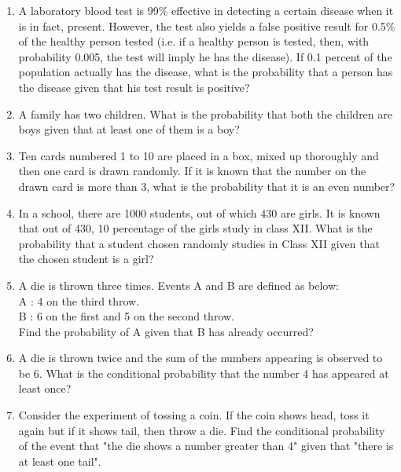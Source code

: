 \begin{enumerate}[label=\thesection.\arabic*.,ref=\thesection.\theenumi]
\item A laboratory blood test is 99$\%$ effective in detecting a certain disease when it is in fact, present. However, the test also yields a false positive result for 0.5$\%$ of the healthy person tested (i.e. if a healthy person is tested, then, with probability 0.005, the test will imply he has the disease). If 0.1 percent of the population actually has the disease, what is the probability that a person has the disease given that his test result is positive?\\
\item A family has two children. What is the probability that both the children are boys given that at least one of them is a boy?\\
%
\solution

\item Ten cards numbered 1 to 10 are placed in a box, mixed up thoroughly and then one card is drawn randomly. If it is known that the number on the drawn card is more than 3, what is the probability that it is an even number?\\
\solution


\item In a school, there are 1000 students, out of which 430 are girls. It is known that out of 430,  10 percentage of the girls study in class XII. What is the probability that a student chosen randomly studies in Class XII given that the chosen student is a girl?\\
\solution


\item A die is thrown three times. Events A and B are defined as below:\\
A : 4 on the third throw.\\
B : 6 on the first and 5 on the second throw.\\
Find the probability of A given that B has already occurred?\\
\solution


\item A die is thrown twice and the sum of the numbers appearing is observed to be 6. What is the conditional probability that the number 4 has appeared at least once?\\
\solution


\item Consider the experiment of tossing a coin. If the coin shows head, toss it again but if it shows tail, then throw a die. Find the conditional probability of the event that "the die shows a number greater than 4" given that "there is at least one tail".\\
\solution



\end{enumerate}
